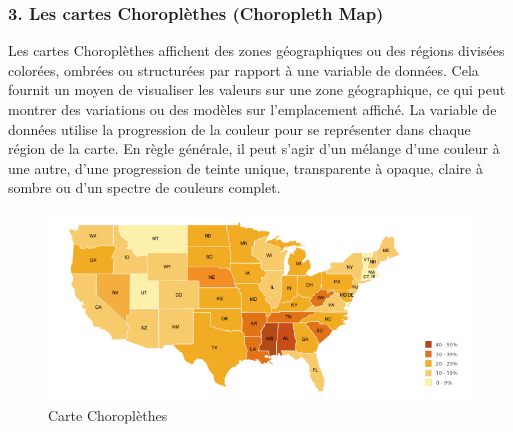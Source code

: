 \documentclass[french, a4paper, 12pt]{report}
\begin{document}
\subsubsection{3. Les cartes Choroplèthes (Choropleth Map)}
Les cartes Choroplèthes affichent des zones géographiques ou des régions divisées colorées, ombrées ou structurées par rapport à une variable de données. Cela fournit un moyen de visualiser les valeurs sur une zone géographique, ce qui peut montrer des variations ou des modèles sur l'emplacement affiché.
La variable de données utilise la progression de la couleur pour se représenter dans chaque région de la carte. En règle générale, il peut s'agir d'un mélange d'une couleur à une autre, d'une progression de teinte unique, transparente à opaque, claire à sombre ou d'un spectre de couleurs complet.
\begin{figure}[!ht]
    \centering
    \includegraphics[height=5cm]{images/choropleth.png}
    \caption{Carte Choroplèthes \footnotemark}
    \label{fig:2.6}
\end{figure}
\end{document}
